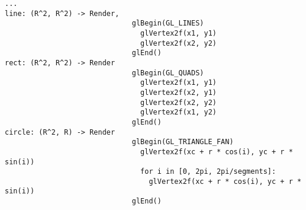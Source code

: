
\begin{lstlisting}[caption={Renderer Definition}]
...
line: (R^2, R^2) -> Render,
                              glBegin(GL_LINES)
                                glVertex2f(x1, y1)
                                glVertex2f(x2, y2)
                              glEnd()
rect: (R^2, R^2) -> Render
                              glBegin(GL_QUADS)
                                glVertex2f(x1, y1)
                                glVertex2f(x2, y1)
                                glVertex2f(x2, y2)
                                glVertex2f(x1, y2)
                              glEnd()
circle: (R^2, R) -> Render
                              glBegin(GL_TRIANGLE_FAN)
                                glVertex2f(xc + r * cos(i), yc + r * sin(i))
                                for i in [0, 2pi, 2pi/segments]:
                                  glVertex2f(xc + r * cos(i), yc + r * sin(i))
                              glEnd()
\end{lstlisting}



\pagebreak
